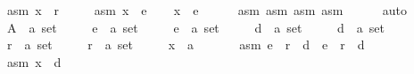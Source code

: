 \begin{isabellebody}
\ \ \ \ asm{}{\isacharcolon}{\kern0pt}\ {\isachardoublequoteopen}x\ {\isasymnotin}\ r{}{\isachardoublequoteclose}\ \isanewline
\ \ \ \ asm{}{\isacharcolon}{\kern0pt}\ {\isachardoublequoteopen}x\ {\isasymin}\ e{}{\isachardoublequoteclose}\isanewline
\ \ \isamarkupfalse%
\ {\isachardoublequoteopen}x\ {\isasymin}\ e{}{\isachardoublequoteclose}\isanewline
\ \ \ \ \isamarkupfalse%
\ asm{}\ asm{}\ asm{}\ asm{}\isanewline
\ \ \ \ \isamarkupfalse%
\ auto\isanewline
{}\isamarkupfalse%
\isanewline
\ \ \isamarkupfalse%
\isanewline
\ \ \ \ A\ {\isacharcolon}{\kern0pt}{\isacharcolon}{\kern0pt}\ {\isachardoublequoteopen}{\isacharprime}{\kern0pt}a\ set{\isachardoublequoteclose}\ \isanewline
\ \ \ \ e{}\ {\isacharcolon}{\kern0pt}{\isacharcolon}{\kern0pt}\ {\isachardoublequoteopen}{\isacharprime}{\kern0pt}a\ set{\isachardoublequoteclose}\ \isanewline
\ \ \ \ e{}\ {\isacharcolon}{\kern0pt}{\isacharcolon}{\kern0pt}\ {\isachardoublequoteopen}{\isacharprime}{\kern0pt}a\ set{\isachardoublequoteclose}\ \isanewline
\ \ \ \ d{}\ {\isacharcolon}{\kern0pt}{\isacharcolon}{\kern0pt}\ {\isachardoublequoteopen}{\isacharprime}{\kern0pt}a\ set{\isachardoublequoteclose}\ \isanewline
\ \ \ \ d{}\ {\isacharcolon}{\kern0pt}{\isacharcolon}{\kern0pt}\ {\isachardoublequoteopen}{\isacharprime}{\kern0pt}a\ set{\isachardoublequoteclose}\ \isanewline
\ \ \ \ r{}\ {\isacharcolon}{\kern0pt}{\isacharcolon}{\kern0pt}\ {\isachardoublequoteopen}{\isacharprime}{\kern0pt}a\ set{\isachardoublequoteclose}\ \isanewline
\ \ \ \ r{}\ {\isacharcolon}{\kern0pt}{\isacharcolon}{\kern0pt}\ {\isachardoublequoteopen}{\isacharprime}{\kern0pt}a\ set{\isachardoublequoteclose}\ \isanewline
\ \ \ \ x\ {\isacharcolon}{\kern0pt}{\isacharcolon}{\kern0pt}\ {\isachardoublequoteopen}{\isacharprime}{\kern0pt}a{\isachardoublequoteclose}\isanewline
\ \ \isamarkupfalse%
\isanewline
\ \ \ \ asm{}{\isacharcolon}{\kern0pt}\ {\isachardoublequoteopen}e{}\ {\isasymunion}\ r{}\ {\isasymunion}\ d{}\ {\isacharequal}{\kern0pt}\ e{}\ {\isasymunion}\ r{}\ {\isasymunion}\ d{}{\isachardoublequoteclose}\ \isanewline
\ \ \ \ asm{}{\isacharcolon}{\kern0pt}\ {\isachardoublequoteopen}x\ {\isasymnotin}\ d{}{\isachardoublequoteclose}\ \isanewline

\end{isabellebody}
